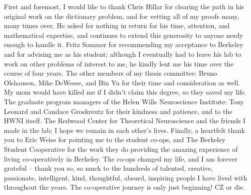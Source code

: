 \documentclass{ucbthesis}
\begin{document}
\begin{frontmatter}

\tableofcontents
\clearpage
\listoffigures
\clearpage

\begin{acknowledgements}
First and foremost, I would like to thank Chris Hillar for clearing the path in his original work on the dictionary problem, and for vetting all of my proofs many, many times over. He asked for nothing in return for his time, attention, and mathematical expertise, and continues to extend this generosity to anyone nerdy enough to handle it. Fritz Sommer for recommending my acceptance to Berkeley and for advising me as his student; although I eventually had to leave his lab to work on other problems of interest to me, he kindly lent me his time over the course of four years. The other members of my thesis committee: Bruno Olshausen, Mike DeWeese, and Bin Yu for their time and consideration as well. My mom would have killed me if I didn't claim this degree, so they saved my life. The graduate program managers of the Helen Wills Neuroscience Institute: Tony Leonard and Candace Groskreutz for their kindness and patience, and to the HWNI itself. The Redwood Center for Theoretical Neuroscience and the friends I made in the lab; I hope we remain in each other's lives. Finally, a heartfelt thank you to Eric Weiss for pointing me to the student co-ops, and The Berkeley Student Cooperative for the work they do providing the amazing experience of living co-operatively in Berkeley. The co-ops changed my life, and I am forever grateful -- thank you so, so much to the hundreds of talented, creative, passionate, intelligent, kind, thoughtful, absurd, inspiring people I have lived with throughout the years. The co-operative journey is only just beginning! CZ or die. 
\end{acknowledgements}

\end{frontmatter}

\pagestyle{headings}


 
 





% 

\printbibliography
\end{document}
